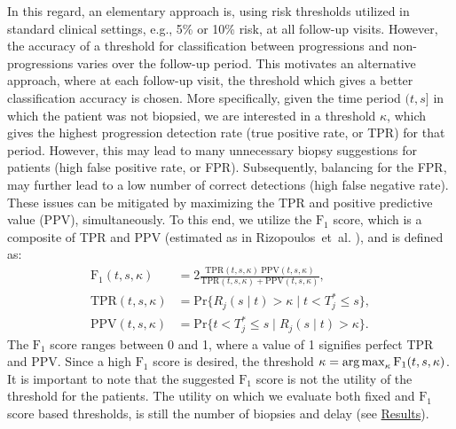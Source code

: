 In this regard, an elementary approach is, using risk thresholds utilized in standard clinical settings, e.g., 5\% or 10\% risk, at all follow-up visits. However, the accuracy of a threshold for classification between progressions and non-progressions varies over the follow-up period. This motivates an alternative approach, where at each follow-up visit, the threshold which gives a better classification accuracy is chosen. More specifically, given the time period $(t, s]$ in which the patient was not biopsied, we are interested in a threshold $\kappa$, which gives the highest progression detection rate (true positive rate, or TPR) for that period. However, this may lead to many unnecessary biopsy suggestions for patients (high false positive rate, or FPR). Subsequently, balancing for the FPR, may further lead to a low number of correct detections (high false negative rate). These issues can be mitigated by maximizing the TPR and positive predictive value (PPV), simultaneously. To this end, we utilize the $\mbox{F}_1$ score, which is a composite of TPR and PPV (estimated as in Rizopoulos~et~al. \cite{landmarking2017}), and is defined as:
\begin{equation}
\label{eq:F1_TPR_PPV}
\begin{split}
\mbox{F}_1(t,  s, \kappa) &= 2\frac{\mbox{TPR}(t,  s, \kappa)\ \mbox{PPV}(t,  s, \kappa)}{\mbox{TPR}(t,  s, \kappa) + \mbox{PPV}(t,  s, \kappa)},\\
\mbox{TPR}(t,  s, \kappa) &= \mbox{Pr}\big\{R_j(s \mid t) > \kappa \mid t < T^*_j \leq s\big\},\\
\mbox{PPV}(t,  s, \kappa) &= \mbox{Pr}\big\{t < T^*_j \leq s \mid R_j(s \mid t) > \kappa \big\}.
\end{split}
\end{equation}
The $\mbox{F}_1$ score ranges between 0 and 1, where a value of 1 signifies perfect TPR and PPV. Since a high $\mbox{F}_1$ score is desired, the threshold ${\kappa=\operatorname{arg\,max}_{\kappa} \mbox{F}_1(t, s, \kappa)}$. It is important to note that the suggested $\mbox{F}_1$ score is not the utility of the threshold for the patients. The utility on which we evaluate both fixed and $\mbox{F}_1$ score based thresholds, is still the number of biopsies and delay (see \hyperref[sec:results]{Results}). 

